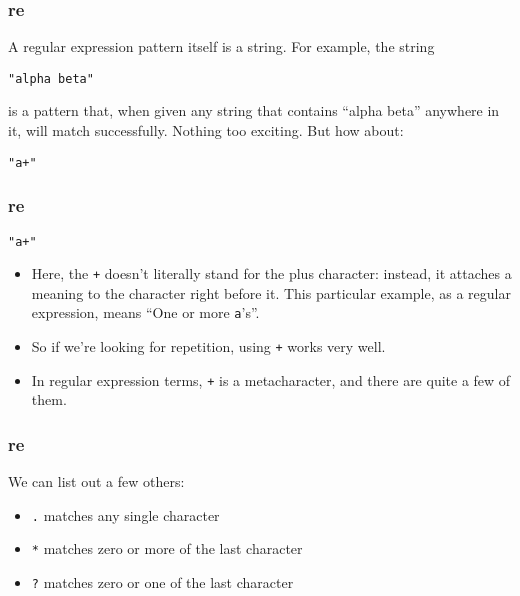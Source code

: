  \begin{frame}[fragile]
\frametitle{re}
 A
regular expression pattern itself is a string.  For example, the
string
\begin{lstlisting}
"alpha beta"
\end{lstlisting}
is a pattern that, when given any string that contains ``alpha beta''
anywhere in it, will match successfully.  Nothing too exciting. But how about:
\begin{lstlisting}
"a+"
\end{lstlisting}
\end{frame}


 \begin{frame}[fragile]
\frametitle{re}

\begin{lstlisting}
"a+"
\end{lstlisting}
\begin{itemize}
\item Here, the \lstinline-+- doesn't literally stand for the plus character:
instead, it attaches a meaning to the character right before it.  This
particular example, as a regular expression, means ``One or more
\texttt{a}'s''.  
\item So if we're looking for repetition, using \lstinline-+-
works very well.  
\item In regular expression terms, \lstinline-+- is a
metacharacter, and there are quite a few of them. 
\end{itemize}
\end{frame}


 \begin{frame}[fragile]
\frametitle{re}
We can list out a
few others:
\begin{itemize}
\item \lstinline+.+ matches any single character
\item \lstinline+*+ matches zero or more of the last character
\item \lstinline+?+ matches zero or one of the last character
\end{itemize}
\end{frame}



